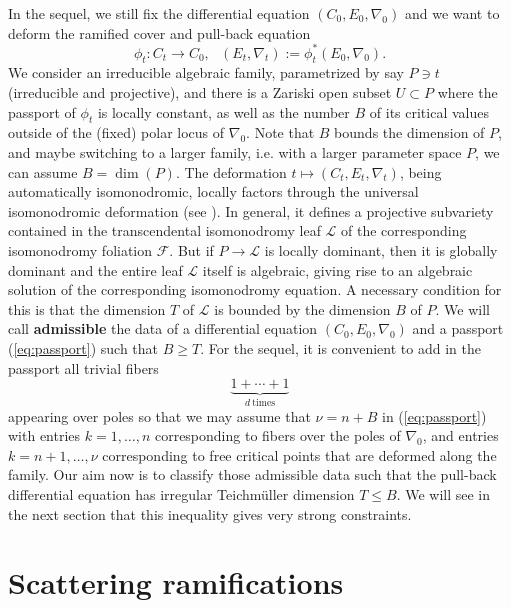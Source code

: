 \documentclass[12]{amsart}
\begin{document}
In the sequel, we still fix the differential equation $(C_0,E_0,\nabla_0)$ and we want to deform the ramified cover 
and pull-back equation
$$\phi_t:C_t\to C_0,\ \ \ (E_t,\nabla_t):=\phi_t^*(E_0,\nabla_0).$$
We consider an irreducible algebraic family, parametrized by say $P\ni t$ (irreducible and projective), 
and there is a Zariski open subset $U\subset P$
where the passport of $\phi_t$ is locally constant, as well as the number $B$ of its critical values outside 
of the (fixed) polar locus of $\nabla_0$. Note that $B$ bounds the dimension of $P$, and maybe switching
to a larger family, i.e. with a larger parameter space $P$, we can assume $B=\dim(P)$.
The deformation $t\mapsto(C_t,E_t,\nabla_t)$, being automatically isomonodromic, locally factors through 
the universal isomonodromic deformation (see \cite{Heu}). In general, it defines a projective subvariety contained in the
transcendental isomonodromy leaf $\mathcal L$ of the corresponding isomonodromy foliation $\mathcal F$. 
But if $P\to\mathcal L$ is locally dominant, then it is globally dominant and the entire leaf $\mathcal L$ itself is algebraic,
giving rise to an algebraic solution of the corresponding isomonodromy equation. 
A necessary condition for this is that the dimension $T$ of $\mathcal L$ is bounded by the dimension $B$ of $P$.
We will call {\bf admissible} the data of a differential equation $(C_0,E_0,\nabla_0)$ and a passport (\ref{eq:passport})
such that $B\ge T$. For the sequel, it is convenient to add in the passport all trivial fibers 
$$\underbrace{1+\cdots+1}_{d\ \text{times}}$$
appearing over poles so that we may assume that $\nu=n+B$ in (\ref{eq:passport}) with entries $k=1,\ldots,n$
corresponding to fibers over the poles of $\nabla_0$, and entries $k=n+1,\ldots,\nu$ corresponding to free critical points
that are deformed along the family. Our aim now is to classify those admissible data such that the pull-back differential 
equation has irregular Teichm\"uller dimension $T\le B$. We will see in the next section that this inequality gives 
very strong constraints.


\section{Scattering ramifications}\label{sec:Scattering}
\end{document}
